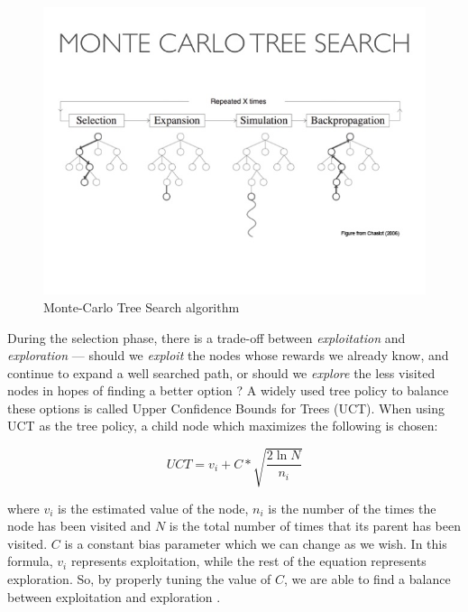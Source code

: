 \begin{figure}[h]
    \centering
    \includegraphics[clip, trim={0 4cm 0 5cm}, scale=.6]{images/mcts.jpg}
    \caption{Monte-Carlo Tree Search algorithm \cite{chaslot2008monte}}
    \label{fig:MCTS}
\end{figure}

During the selection phase, there is a trade-off between \textit{exploitation} and \textit{exploration} --- should we \textit{exploit} the nodes whose rewards we already know, and continue to expand a well searched path, or should we \textit{explore} the less visited nodes in hopes of finding a better option \cite{nakhost2009monte}?  A widely used tree policy to balance these options is called Upper Confidence Bounds for Trees (UCT).  When using UCT as the tree policy, a child node which maximizes the following is chosen:
    
\begin{equation}\label{eq:UCT}
    UCT = v_i + C * \sqrt{\frac{2\ln N}{n_i}}
\end{equation}
    
where $v_i$ is the estimated value of the node, $n_i$ is the number of the times the node has been visited and $N$ is the total number of times that its parent has been visited.  $C$ is a constant bias parameter which we can change as we wish.  In this formula, $v_i$ represents exploitation, while the rest of the equation represents exploration.  So, by properly tuning the value of $C$, we are able to find a balance between exploitation and exploration \cite{lucas2014fast}\cite{audibert2009exploration}.

